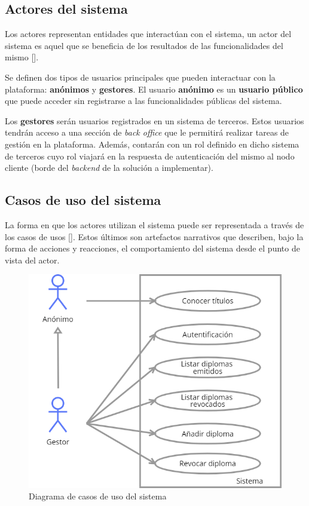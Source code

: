 \subsection{Actores del sistema}
Los actores representan entidades que interactúan con el sistema, un actor del sistema es aquel que se beneficia de los resultados de las funcionalidades del mismo [\cite{91}]. 

Se definen dos tipos de usuarios principales que pueden interactuar con la plataforma: \textbf{anónimos} y \textbf{gestores}. El usuario \textbf{anónimo} es un \textbf{usuario público} que puede acceder sin registrarse a las funcionalidades públicas del sistema.

Los \textbf{gestores} serán usuarios registrados en un sistema de terceros. Estos usuarios tendrán acceso a una sección de \textit{back office} que le permitirá realizar tareas de gestión en la plataforma. Además, contarán con un rol definido en dicho sistema de terceros cuyo rol viajará en la respuesta de autenticación del mismo al nodo cliente (borde del \textit{backend} de la solución a implementar).

\subsection{Casos de uso del sistema}
La forma en que los actores utilizan el sistema puede ser representada a través de los casos de usos [\cite{91}]. Estos últimos son artefactos narrativos que describen, bajo la forma de acciones y reacciones, el comportamiento del sistema desde el punto de vista del actor.

\begin{figure}[!h]
\centering
\includegraphics[scale=0.6]{Graphics/useCasest}
\caption{Diagrama de casos de uso del sistema}
\label{fig:useCases}
\end{figure}

